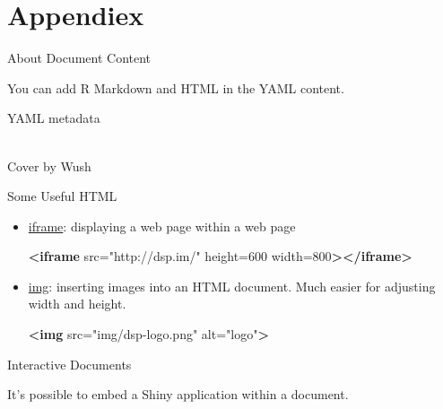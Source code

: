 \documentclass[ignorenonframetext,]{beamer}
\newenvironment{Shaded}{\begin{snugshade}}{\end{snugshade}}
\newcommand{\KeywordTok}[1]{\textcolor[rgb]{0.13,0.29,0.53}{\textbf{#1}}}
\newcommand{\StringTok}[1]{\textcolor[rgb]{0.31,0.60,0.02}{#1}}
\newcommand{\OtherTok}[1]{\textcolor[rgb]{0.56,0.35,0.01}{#1}}
\begin{document}
\section{Appendiex}\label{appendiex}

\begin{frame}{About Document Content}

You can add R Markdown and HTML in the YAML content.

\end{frame}

\begin{frame}{YAML metadata}

\\
Cover by Wush

\end{frame}

\begin{frame}[fragile]{Some Useful HTML}

\begin{itemize}
\item
  \href{http://www.w3schools.com/tags/tag_iframe.asp}{iframe}:
  displaying a web page within a web page

\begin{Shaded}
\begin{Highlighting}[]
\KeywordTok{<iframe}\OtherTok{ src=}\StringTok{"http://dsp.im/"}\OtherTok{ height=}\StringTok{600}\OtherTok{ width=}\StringTok{800}\KeywordTok{></iframe>}
\end{Highlighting}
\end{Shaded}
\item
  \href{http://www.w3schools.com/tags/tag_img.asp}{img}: inserting
  images into an HTML document. Much easier for adjusting width and
  height.

\begin{Shaded}
\begin{Highlighting}[]
\KeywordTok{<img}\OtherTok{ src=}\StringTok{"img/dsp-logo.png"}\OtherTok{ alt=}\StringTok{"logo"}\KeywordTok{>}
\end{Highlighting}
\end{Shaded}
\end{itemize}

\end{frame}

\begin{frame}{Interactive Documents}

It's possible to embed a Shiny application within a document.

\end{frame}
\end{document}
